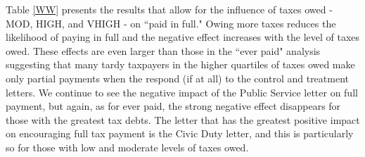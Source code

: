 \documentclass[12pt,titlepage]{article}
\begin{document}
Table \ref{WW} presents the results that allow for the influence of taxes owed - MOD, HIGH, and VHIGH - on ``paid in full."  Owing more taxes reduces the likelihood of paying in full and the negative effect increases with the level of taxes owed.  These effects are even larger than those in the ``ever paid" analysis suggesting that many tardy taxpayers in the higher quartiles of taxes owed make only partial payments when the respond (if at all) to the control and treatment letters.   We continue to see the negative impact of the Public Service letter on full payment, but again, as for ever paid, the strong negative effect disappears for those with the greatest tax debts.  The letter that has the greatest positive impact on encouraging full tax payment is the Civic Duty letter, and this is particularly so for those with low and moderate levels of taxes owed.  
\end{document}
